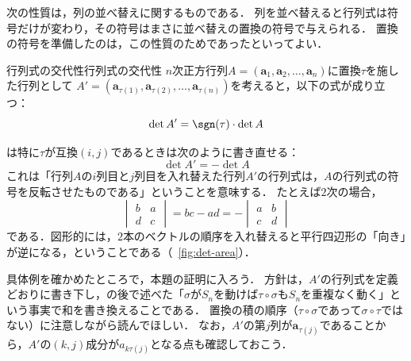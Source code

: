 次の性質は，列の並べ替えに関するものである．
列を並べ替えると行列式は符号だけが変わり，その符号はまさに並べ替えの置換の符号で与えられる．
置換の符号を準備したのは，この性質のためであったといってよい．

\begin{prop}{行列式の交代性}{行列式の交代性}
  $n$次正方行列$A = (\bm{a}_1, \bm{a}_2, \dots, \bm{a}_n)$に置換$\tau$を施した行列として
  $A' = (\bm{a}_{\tau(1)}, \bm{a}_{\tau(2)}, \dots, \bm{a}_{\tau(n)})$を考えると，以下の式が成り立つ：
  \[
  \det A ' = \sgn (\tau) \cdot \det A
  \]
\end{prop}

は特に$\tau$が互換$(i,j)$であるときは次のように書き直せる：
\[
\det A'  = -\det A
\]
これは「行列$A$の$i$列目と$j$列目を入れ替えた行列$A'$の行列式は，$A$の行列式の符号を反転させたものである」ということを意味する．
たとえば$2$次の場合，
\[
  \begin{vmatrix} b & a \\ d & c \end{vmatrix} = bc - ad = -\begin{vmatrix} a & b \\ c & d \end{vmatrix}
\]
である．図形的には，$2$本のベクトルの順序を入れ替えると平行四辺形の「向き」が逆になる，ということである（\figurename~\ref{fig:det-area}）．

具体例を確かめたところで，本題の証明に入ろう．
方針は，$A'$の行列式を定義どおりに書き下し，の後で述べた「$\sigma$が$S_n$を動けば$\tau \circ \sigma$も$S_n$を重複なく動く」という事実で和を書き換えることである．
置換の積の順序（$\tau \circ \sigma$であって$\sigma \circ \tau$ではない）に注意しながら読んでほしい．
なお，$A'$の第$j$列が$\bm{a}_{\tau(j)}$であることから，$A'$の$(k, j)$成分が$a_{k\tau(j)}$となる点も確認しておこう．

